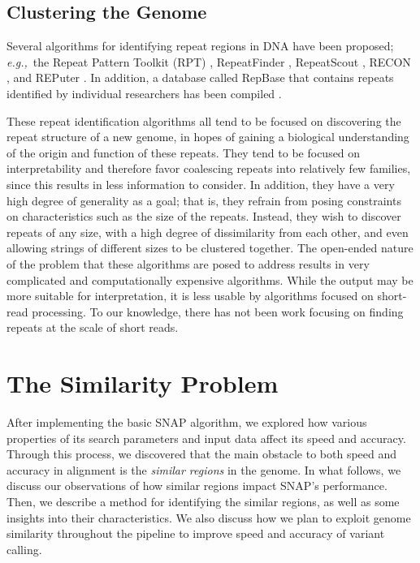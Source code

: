\documentclass[twocolumn,10pt]{article}
\newcommand{\eg}{{\em e.g.,}~}
\begin{document}
\subsection{Clustering the Genome}
\label{section:clusteringTheGenome}

Several algorithms for identifying repeat regions in DNA have been proposed; \eg the Repeat Pattern Toolkit (RPT) \cite{Agarwal:1994}, RepeatFinder \cite{Volfovsky:2001}, RepeatScout \cite{Price:2005}, RECON \cite{Bao:2002}, and REPuter \cite{Kurtz:1999}.  In addition, a database called RepBase that contains repeats identified by individual researchers has been compiled \cite{Jurka:2005}.

These repeat identification algorithms all tend to be focused on discovering the repeat structure of a new genome, in hopes of gaining a biological understanding of the origin and function of these repeats.  They tend to be focused on interpretability and therefore favor coalescing repeats into relatively few families, since this results in less information to consider.  In addition, they have a very high degree of generality as a goal; that is, they refrain from posing constraints on characteristics such as the size of the repeats.  Instead, they wish to discover repeats of any size, with a high degree of dissimilarity from each other, and even allowing strings of different sizes to be clustered together.  The open-ended nature of the problem that these algorithms are posed to address results in very complicated and computationally expensive algorithms.  While the output may be more suitable for interpretation, it is less usable by algorithms focused on short-read processing.  To our knowledge, there has not been work focusing on finding repeats at the scale of short reads.

\section{The Similarity Problem}
\label{section:similarityProblem}

After implementing the basic SNAP algorithm, we explored how various properties of its search parameters and input data affect its speed and accuracy.  Through this process, we discovered that the main obstacle to both speed and accuracy in alignment is the \textit{similar regions} in the genome.  In what follows, we discuss our observations of how similar regions impact SNAP's performance.  Then, we describe a method for identifying the similar regions, as well as some insights into their characteristics.  We also discuss how we plan to exploit genome similarity throughout the pipeline to improve speed and accuracy of variant calling.
\end{document}
